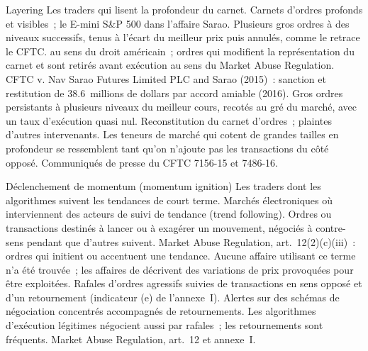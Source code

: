 \begin{strategyfile}{Layering}\label{strat:s2:manipulative-strategies-and-how-they-are-caught:layering}
 Les traders qui lisent la profondeur du carnet.
 Carnets d'ordres profonds et visibles~; le E-mini S\&P 500 dans l'affaire Sarao.
 Plusieurs gros ordres à des niveaux successifs, tenus à l'écart du meilleur prix puis annulés, comme le retrace le CFTC.
  au sens du droit américain~; ordres qui modifient la représentation du carnet et sont retirés avant exécution au sens du Market Abuse
Regulation.
 CFTC v. Nav Sarao Futures Limited PLC and Sarao (2015)~: sanction et restitution de 38.6~millions de dollars par accord amiable (2016).
 Gros ordres persistants à plusieurs niveaux du meilleur cours, recotés au gré du marché, avec un taux d'exécution quasi nul.
 Reconstitution du carnet d'ordres~; plaintes d'autres intervenants.
 Les teneurs de marché qui cotent de grandes tailles en profondeur se ressemblent tant qu'on n'ajoute pas les transactions du côté opposé.
 Communiqués de presse du CFTC 7156-15 et 7486-16.
\end{strategyfile}

\begin{strategyfile}{Déclenchement de momentum (momentum ignition)}\label{strat:s2:manipulative-strategies-and-how-they-are-caught:momentum}
 Les traders dont les algorithmes suivent les tendances de court terme.
 Marchés électroniques où interviennent des acteurs de suivi de tendance (trend following).
 Ordres ou transactions destinés à lancer ou à exagérer un mouvement, négociés à contre-sens pendant que d'autres suivent.
 Market Abuse Regulation, art.~12(2)(c)(iii)~: ordres qui initient ou accentuent une tendance.
 Aucune affaire utilisant ce terme n'a été trouvée~; les affaires de  décrivent des variations de prix provoquées pour être exploitées.
 Rafales d'ordres agressifs suivies de transactions en sens opposé et d'un retournement (indicateur (e) de l'annexe~I).
 Alertes sur des schémas de négociation concentrés accompagnés de retournements.
 Les algorithmes d'exécution légitimes négocient aussi par rafales~; les retournements sont fréquents.
 Market Abuse Regulation, art.~12 et annexe~I.
\end{strategyfile}

